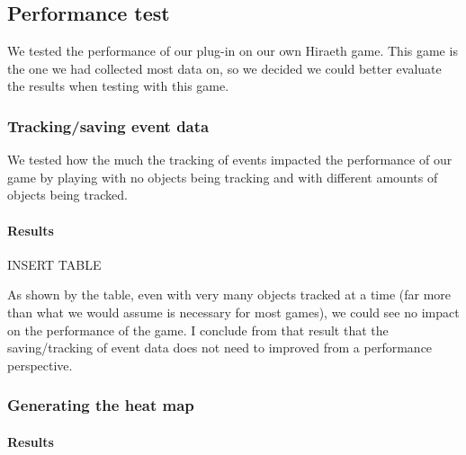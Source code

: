 \subsection{Performance test}
\label{Test_P}
We tested the performance of our plug-in on our own Hiraeth game. This game is the one we had collected most data on, so we decided we could better evaluate the results when testing with this game.

\subsubsection{Tracking/saving event data}
\label{Test_P_Saving}
We tested how the much the tracking of events impacted the performance of our game by playing with no objects being tracking and with different amounts of objects being tracked.

\paragraph{Results}
INSERT TABLE

As shown by the table, even with very many objects tracked at a time (far more than what we would assume is necessary for most games), we could see no impact on the performance of the game. I conclude from that result that the saving/tracking of event data does not need to improved from a performance perspective.

\subsubsection{Generating the heat map}
\label{Test_P_Generating}


\paragraph{Results}